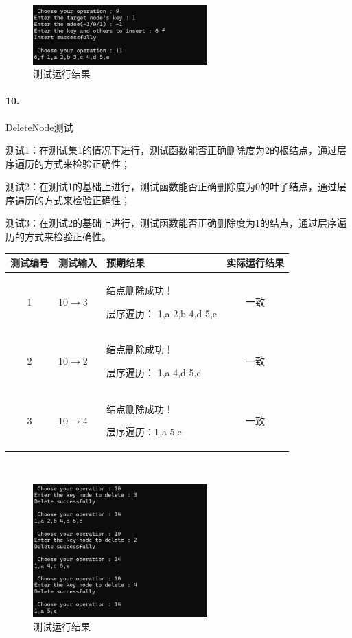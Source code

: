 \documentclass[supercite]{Experimental_Report}
\theoremstyle{definition}
\begin{document}
~\

\begin{figure}[H]
 	\centering
 	\includegraphics[width=0.6\textwidth]{images/二叉树测试9.png}
 	\caption{测试运行结果}
 	\label{txlab}
 \end{figure}

\paragraph{10.}DeleteNode测试

测试1：在测试集1的情况下进行，测试函数能否正确删除度为2的根结点，通过层序遍历的方式来检验正确性；

测试2：在测试1的基础上进行，测试函数能否正确删除度为0的叶子结点，通过层序遍历的方式来检验正确性；

测试3：在测试2的基础上进行，测试函数能否正确删除度为1的结点，通过层序遍历的方式来检验正确性。

\vspace{0.5em}

\begin{tabular}{|c|l|l|c|}
	\hline
	测试编号 & 测试输入 & 预期结果 & 实际运行结果 \\
	\hline
	1 & 10$\rightarrow$3& 结点删除成功！

层序遍历： 1,a 2,b 4,d 5,e & 一致 \\
	\hline
	2 & 10$\rightarrow$2& 结点删除成功！

层序遍历： 1,a 4,d 5,e & 一致 \\
	\hline
	3 & 10$\rightarrow$4 & 结点删除成功！

层序遍历：1,a 5,e & 一致 \\
	\hline
\end{tabular}

~\

\begin{figure}[H]
 	\centering
 	\includegraphics[width=0.6\textwidth]{images/二叉树测试10.png}
 	\caption{测试运行结果}
 	\label{txlab}
 \end{figure}
\end{document}
